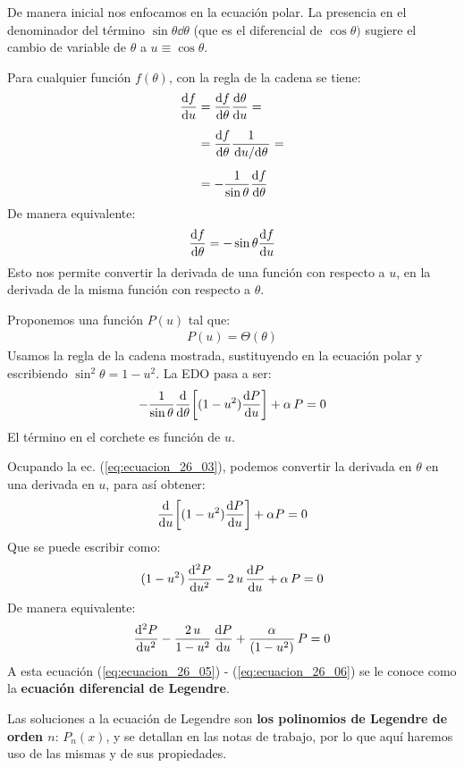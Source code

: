 \documentclass[12pt]{article}
\numberwithin{equation}{section}
\begin{document}
De manera inicial nos enfocamos en la ecuación polar. La presencia en el denominador del término $\sin \theta \dd{\theta}$ (que es el diferencial de $\cos \theta)$ sugiere el cambio de variable de $\theta$ a $u \equiv \cos \theta$.
\par
Para cualquier función $f (\theta)$, con la regla de la cadena se tiene:
\begin{eqnarray*}
\begin{aligned}
\dv{f}{u} &= \dv{f}{\theta} \dv{\theta}{u} = \\[0.5em] 
&= \dv{f}{\theta} \dfrac{1}{\dv*{u}{\theta}} = \\[0.5em] 
&= - \dfrac{1}{\sin \theta} \dv{f}{\theta}
\end{aligned}
\end{eqnarray*}
De manera equivalente:
\begin{align}
\dv{f}{\theta} = - \sin \theta \dv{f}{u}
\label{eq:ecuacion_26_03}
\end{align}
Esto nos permite convertir la derivada de una función con respecto a $u$, en la derivada de la misma función con respecto a $\theta$.
\par
Proponemos una función $P(u)$ tal que:
\begin{align*}
P (u) = \Theta(\theta)
\end{align*}
Usamos la regla de la cadena mostrada, sustituyendo en la ecuación polar y escribiendo $\sin^{2} \theta = 1 - u^{2}$. La EDO pasa a ser:
\begin{align*}
- \dfrac{1}{\sin \theta} \dv{\theta} \bigg[ (1 - u^{2}) \dv{P}{u} \bigg] + \alpha \, P = 0
\end{align*}
El término en el corchete es función de $u$.
\par
Ocupando la ec. (\ref{eq:ecuacion_26_03}), podemos convertir la derivada en $\theta$ en una derivada en $u$, para así obtener:
\begin{align}
\dv{u} \bigg[ (1 - u^{2}) \dv{P}{u} \bigg] + \alpha P = 0
\label{eq:ecuacion_26_04}
\end{align}
Que se puede escribir como:
\begin{align}
(1 - u^{2}) \, \dv[2]{P}{u} - 2 \, u \, \dv{P}{u} + \alpha \, P = 0
\label{eq:ecuacion_26_05}
\end{align}
De manera equivalente:
\begin{align}
\dv[2]{P}{u} - \dfrac{2 \, u}{1 - u^{2}} \, \dv{P}{u} + \dfrac{\alpha}{(1 - u^{2})} \, P = 0
\label{eq:ecuacion_26_06}
\end{align}
A esta ecuación (\ref{eq:ecuacion_26_05}) - (\ref{eq:ecuacion_26_06}) se le conoce como la \textbf{ecuación diferencial de Legendre}.
\par
Las soluciones a la ecuación de Legendre son \textbf{los polinomios de Legendre de orden $n$}: $P_{n} (x)$, y se detallan en las notas de trabajo, por lo que aquí haremos uso de las mismas y de sus propiedades.
\end{document}
